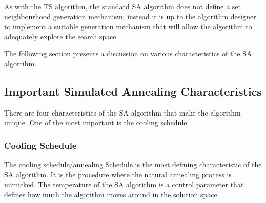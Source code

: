 As with the TS algorithm, the standard SA algorithm does not define a set neighbourhood generation mechanism; instead it is up to the algorithm designer to implement a suitable generation mechanism that will allow the algorithm to adequately explore the search space\cite{VariousCoolingSA}. 

The following section presents a discussion on various characteristics of the SA algortihm.
\subsection{Important Simulated Annealing Characteristics}
There are four characteristics of the SA algorithm that make the algorithm unique. One of the most important is the cooling schedule. 


\subsubsection{Cooling Schedule}
The cooling schedule/annealing Schedule is the most defining characteristic of the SA algorithm. It is the procedure where the natural annealing process is mimicked. The temperature of the SA algorithm is a control parameter that defines how much the algorithm moves around in the solution space.

